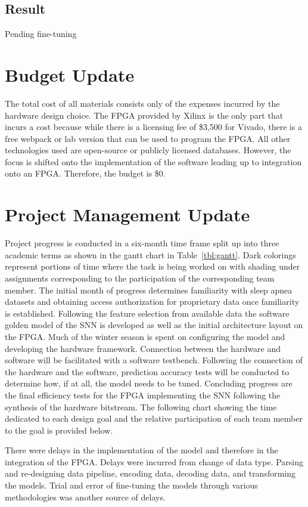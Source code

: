 \documentclass[12pt,titlepage]{article}
\begin{document}
\subsection{Result}
Pending fine-tuning

\section{Budget Update}
The total cost of all materials consists only of the expenses incurred by the hardware design choice. The FPGA provided by Xilinx is
the only part that incurs a cost because while there is a licensing fee of \$3,500 for Vivado, there is a free webpack or lab version
that can be used to program the FPGA. All other technologies used are open-source or publicly licensed databases. However, the focus
is shifted onto the implementation of the software leading up to integration onto an FPGA. Therefore, the budget is \$0.

\section{Project Management Update}
Project progress is conducted in a six-month time frame split up into three academic terms as shown in the gantt chart in Table~\ref{tbl:gantt}.
Dark colorings represent portions of time where the task is being worked on with shading under assignments corresponding to the participation of
the corresponding team member. The initial month of progress determines familiarity with sleep
apnea datasets and obtaining access authorization for proprietary data once familiarity is established. Following the feature selection from available data
the software golden model of the SNN is developed as well as the initial architecture layout on the FPGA. Much of the winter season is spent on configuring
the model and developing the hardware framework. Connection between the hardware and software will be facilitated with a software testbench. Following the
connection of the hardware and the software, prediction accuracy tests will be conducted to determine how, if at all, the model needs to be tuned. Concluding
progress are the final efficiency tests for the FPGA implementing the SNN following the synthesis of the hardware bitstream. The following chart showing the
time dedicated to each design goal and the relative participation of each team member to the goal is provided below.

There were delays in the implementation of the model and therefore in the integration of the FPGA. Delays were incurred from change of data
type. Parsing and re-designing data pipeline, encoding data, decoding data, and transforming the models. Trial and error of fine-tuning
the models through various methodologies was another source of delays.
\end{document}
